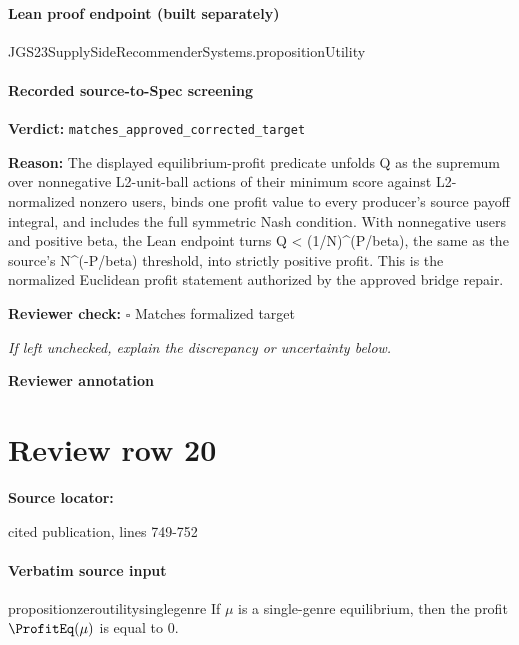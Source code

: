 \documentclass[10pt]{article}
\newcommand{\reviewerbox}{%
  \par\noindent\fbox{\parbox{0.96\linewidth}{\rule{0pt}{0.38in}}}\par
}
\newcommand{\reviewmatch}[1]{%
  \par\noindent\textbf{Reviewer check:} $\square$\; #1\par
  \noindent\emph{If left unchecked, explain the discrepancy or uncertainty below.}\par
}
\begin{document}
\paragraph{Lean proof endpoint (built separately)}\begin{ReviewVerbatim}
JGS23SupplySideRecommenderSystems.propositionUtility
\end{ReviewVerbatim}

\paragraph{Recorded source-to-Spec screening}
\textbf{Verdict:} \texttt{matches\_approved\_corrected\_target}
\\
{\raggedright
\textbf{Reason:} The displayed equilibrium-\allowbreak{}profit predicate unfolds Q as the supremum over nonnegative L2-\allowbreak{}unit-\allowbreak{}ball actions of their minimum score against L2-\allowbreak{}normalized nonzero users, binds one profit value to every producer's source payoff integral, and includes the full symmetric Nash condition.\allowbreak{} With nonnegative users and positive beta, the Lean endpoint turns Q < (1/\allowbreak{}N)\textasciicircum{}(P/\allowbreak{}beta), the same as the source's N\textasciicircum{}(-\allowbreak{}P/\allowbreak{}beta) threshold, into strictly positive profit.\allowbreak{} This is the normalized Euclidean profit statement authorized by the approved bridge repair.\allowbreak{}
\par}
\reviewmatch{Matches formalized target}
\noindent\textbf{Reviewer annotation}\par
\reviewerbox
\clearpage
\hypertarget{source-claim-494c398003f200f3}{}
\section*{Review row 20}
\textbf{Source locator:} {\footnotesize\raggedright cited publication, lines 749-\allowbreak{}752\par}
\paragraph{Verbatim source input}
\begin{ReviewVerbatim}
\begin{restatable}{proposition}{zeroutilitysinglegenre}
\label{prop:zeroutilitysinglegenre}
If $\mu$ is a single-genre equilibrium, then the profit $\ProfitEq(\mu)$ is equal to $0$.
\end{restatable}
\end{ReviewVerbatim}
\end{document}
